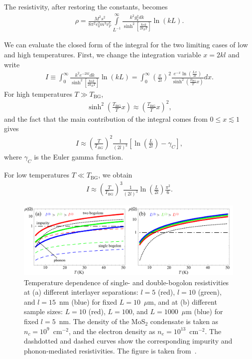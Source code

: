 The resistivity, after restoring the constants, becomes
%
\begin{eqnarray}
\rho=\frac{M^2s^2}{8\pi^2e_0^2m^3v_F^5}\int\limits_{L^{-1}}^\infty
\frac{k^2g_k^2dk}{\sinh^2\left[\frac{\hbar sk}{2k_BT}\right]}\ln(kL).
\end{eqnarray}
%

We can evaluate the closed form of the integral for the two limiting cases of low and high temperatures.
First, we change the integration variable $x=2kl$ and write
%
\begin{eqnarray}
I\equiv\int_0^\infty\frac{k^2e^{-2kl}dk}{\sinh^2\left[\frac{\hbar sk}{2k_BT}\right]}\ln(kL)=\int_0^\infty\left(\frac{x}{2l}\right)^2\frac{e^{-x}\ln(\frac{Lx}{2l})}{\sinh^2\left(\frac{T_\textrm{BG}}{T}x\right)}dx.
\end{eqnarray}
%
For high temperatures $T\gg T_\textrm{BG}$,
%
\begin{eqnarray}
\sinh^2\left(\frac{T_\textrm{BG}}{T}x\right)\approx\left(\frac{T_\textrm{BG}}{T}x\right)^2,
\end{eqnarray}
%
and the fact that the main contribution of the integral comes from $0\leq x\lesssim 1$ gives
%
\begin{eqnarray}
I\approx\left(\frac{T}{T_{BG}}\right)^2\frac{1}{(2l)^3}\left[\ln\left(\frac{L}{2l}\right)-\gamma_C\right],
\end{eqnarray}
%
where $\gamma_C$ is the Euler gamma function.

For low temperatures $T\ll T_\textrm{BG}$, we obtain
\begin{eqnarray}
I\approx\left(\frac{T}{T_\textrm{BG}}\right)^3\frac{1}{(2l)^3}\ln\left(\frac{L}{2l}\right)\frac{\pi^2}{6}.
\end{eqnarray}
%

%
%
%
\begin{figure}[ht]
\includegraphics[width=0.99\textwidth]{Fig/AP7/Fig1S.pdf}
\caption[Temperature dependence of single- and double-bogolon resistivity]{Temperature dependence of single- and double-bogolon resistivities at
(a) different interlayer separations: $l=5$ (red), $l=10$ (green), and $l=15$~nm (blue) for fixed $L=10$~$\mu$m,
and at
(b) different sample sizes: $L=10$ (red), $L=100$, and $L=1000$~$\mu$m (blue) for fixed $l=5$~nm.
The density of the MoS$_2$ condensate is taken as $n_c=10^9$~cm$^{-2}$, and the electron density as $n_e=10^{13}$~cm$^{-2}$.
The dashdotted and dashed curves show the corresponding impurity and phonon-mediated resistivities. The figure is taken from~\cite{Villegas:2019aa}.}
\label{AP7_Fig1S}
\end{figure}
%
%
%

